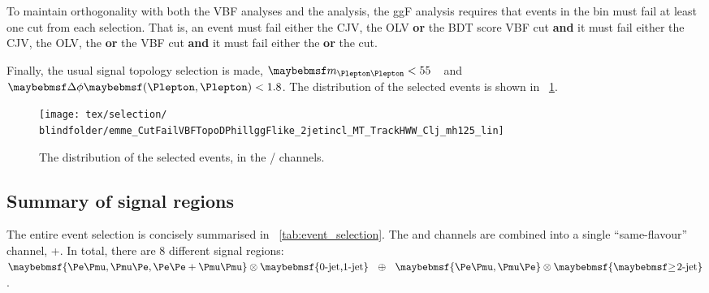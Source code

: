 To maintain orthogonality with both the VBF analyses and the \VH analysis, the ggF analysis 
requires that events in the \twojet bin must fail at least one cut from each selection. That 
is, an event must fail either the CJV, the OLV \textbf{or} the BDT score VBF cut 
\textbf{and} it must fail either the CJV, the OLV, the \mjj \textbf{or} the \dyjj VBF cut 
\textbf{and} it must fail either the \dyjj \textbf{or} the \mjj \VH cut.

Finally, the usual signal topology selection is made, \unit{$\mll < 55$}{\GeV} and 
$\dphill < 1.8$. 
The \mt distribution of the selected \twojet events is shown in \Figure~\ref{fig:sel:2j:mt}.

\begin{figure}[t]
	\texttt{[image: tex/selection/\\blindfolder/emme\_CutFailVBFTopoDPhillggFlike\_2jetincl\_MT\_TrackHWW\_Clj\_mh125\_lin]}
	\caption{The \mt distribution of the selected \twojet events, in the \emch/\mech 
	channels.}
	\label{fig:sel:2j:mt}
\end{figure}



\subsection{Summary of signal regions}
\label{sec:selection:summary}

The entire event selection is concisely summarised in \Table~\ref{tab:event_selection}. The 
\eech and \mmch channels are combined into a single ``same-flavour'' channel, \eech{}+\mmch.
In total, there are 8 different signal regions: $\braces{\emch,\mech,\eech{}+\mmch} 
\otimes \braces{\text{0-jet,1-jet}}~~\oplus~~\braces{\emch,\mech} \otimes \braces{\twojet}$. 

